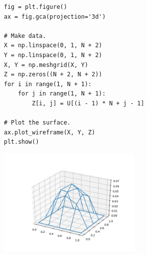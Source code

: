 \documentclass{beamer}
\begin{document}
\begin{frame}[fragile] 
\begin{verbatim}
fig = plt.figure()
ax = fig.gca(projection='3d')

# Make data.
X = np.linspace(0, 1, N + 2)
Y = np.linspace(0, 1, N + 2)
X, Y = np.meshgrid(X, Y)
Z = np.zeros((N + 2, N + 2))
for i in range(1, N + 1):
    for j in range(1, N + 1):
        Z[i, j] = U[(i - 1) * N + j - 1]

# Plot the surface.
ax.plot_wireframe(X, Y, Z)
plt.show()
\end{verbatim}

\end{frame}

\begin{frame}
 \begin{center}
\includegraphics[width=7cm]{surface.png}
\end{center}
\end{frame}
\end{document}
